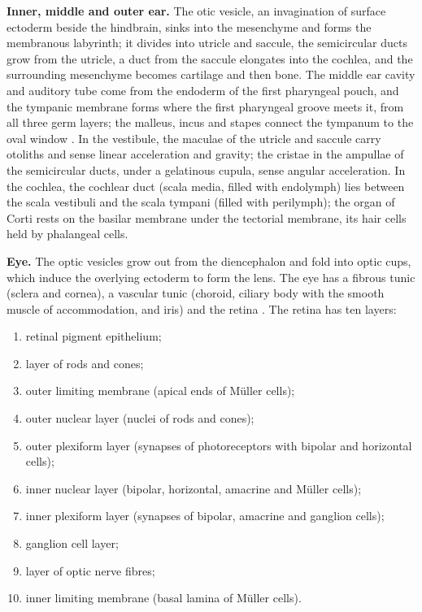 \textbf{Inner, middle and outer ear.} The
otic vesicle, an invagination of surface
ectoderm beside the hindbrain, sinks into the
mesenchyme and forms the membranous
labyrinth; it divides
into utricle and saccule, the semicircular
ducts grow from the utricle, a duct from the
saccule elongates into the cochlea, and the
surrounding mesenchyme becomes cartilage and
then bone. The middle ear cavity and auditory
tube come from the endoderm of the first
pharyngeal pouch, and the tympanic membrane
forms where the first pharyngeal groove meets
it, from all three germ layers; the malleus,
incus and stapes connect the tympanum to the
oval window \cite[Chapter
25]{ross2011histology}. In the vestibule, the
maculae of the utricle and saccule carry
otoliths and sense linear acceleration and
gravity; the cristae in the ampullae of the
semicircular ducts, under a gelatinous
cupula, sense angular acceleration. In the
cochlea, the cochlear duct (scala media,
filled with endolymph) lies between the scala
vestibuli and the scala tympani (filled with
perilymph); the organ of Corti rests on the
basilar membrane under the tectorial
membrane, its hair cells held by phalangeal
cells.

\textbf{Eye.} The optic vesicles grow out
from the diencephalon and fold into optic
cups, which induce the overlying ectoderm to
form the lens. The eye has a fibrous tunic
(sclera and cornea), a vascular tunic
(choroid, ciliary body with the smooth muscle
of accommodation, and iris) and the retina
\cite[Chapter 24]{ross2011histology}. The
retina has ten layers:

\begin{enumerate}
\item retinal pigment epithelium;
\item layer of rods and cones;
\item outer limiting membrane (apical ends of
M\"uller cells);
\item outer nuclear layer (nuclei of rods and
cones);
\item outer plexiform layer (synapses of
photoreceptors with bipolar and horizontal
cells);
\item inner nuclear layer (bipolar,
horizontal, amacrine and M\"uller cells);
\item inner plexiform layer (synapses of
bipolar, amacrine and ganglion cells);
\item ganglion cell layer;
\item layer of optic nerve fibres;
\item inner limiting membrane (basal lamina
of M\"uller cells).
\end{enumerate}


